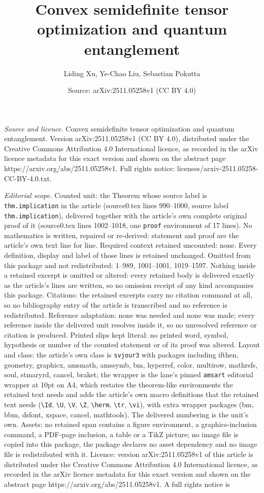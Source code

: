 \documentclass[10pt,a4paper]{amsart}
\title[Convex semidefinite tensor optimization and quantum entangle]{Convex semidefinite tensor optimization and quantum entanglement}
\author{Liding Xu, Ye-Chao Liu, Sebastian Pokutta}
\date{Source: arXiv:2511.05258v1 (CC BY 4.0)}
\begin{document}
\maketitle

\noindent\emph{Source and licence.} Convex semidefinite tensor optimization and quantum entanglement. Version arXiv:2511.05258v1 (CC BY 4.0), distributed under the Creative Commons Attribution 4.0 International licence, as recorded in the arXiv licence metadata for this exact version and shown on the abstract page https://arxiv.org/abs/2511.05258v1. Full rights notice: licenses/arxiv-2511.05258-CC-BY-4.0.txt.\par\smallskip

\noindent\textit{Editorial scope.} Counted unit: the Theorem whose source label is \texttt{thm.implication} in the article (source0.tex lines 990--1000, source label \texttt{thm.implication}), delivered together with the article's own complete original proof of it (source0.tex lines 1002--1018, one \texttt{proof} environment of 17 lines). No mathematics is written, repaired or re-derived: statement and proof are the article's own text line for line. Required context retained uncounted: none. Every definition, display and label of those lines is retained unchanged. Omitted from this package and not redistributed: 1--989, 1001--1001, 1019--1597. Nothing inside a retained excerpt is omitted or altered: every retained body is delivered exactly as the article's lines are written, so no omission receipt of any kind accompanies this package. Citations: the retained excerpts carry no citation command at all, so no bibliography entry of the article is transcribed and no reference is redistributed. Reference adaptation: none was needed and none was made; every reference inside the delivered unit resolves inside it, so no unresolved reference or citation is produced. Printed slips kept literal: no printed word, symbol, hypothesis or number of the counted statement or of its proof was altered. Layout and class: the article's own class is \texttt{svjour3} with packages including ifthen, geometry, graphicx, amsmath, amssymb, bm, hyperref, color, multirow, mathrsfs, soul, stmaryrd, cancel, braket; the wrapper is the lane's pinned \texttt{amsart} editorial wrapper at 10pt on A4, which restates the theorem-like environments the retained text needs and adds the article's own macro definitions that the retained text needs (\texttt{\textbackslash Id}, \texttt{\textbackslash U}, \texttt{\textbackslash V}, \texttt{\textbackslash Z}, \texttt{\textbackslash herm}, \texttt{\textbackslash tr}, \texttt{\textbackslash vi}), with extra wrapper packages (bm, bbm, dsfont, xspace, cancel, mathtools). The delivered numbering is the unit's own. Assets: no retained span contains a figure environment, a graphics-inclusion command, a PDF-page inclusion, a table or a TikZ picture; no image file is copied into this package, the package declares no asset dependency and no image file is redistributed with it. Licence: version arXiv:2511.05258v1 of this article is distributed under the Creative Commons Attribution 4.0 International licence, as recorded in the arXiv licence metadata for this exact version and shown on the abstract page https://arxiv.org/abs/2511.05258v1. A full rights notice is 
\end{document}
